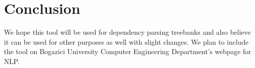 \section{Conclusion}
\label{sec:conclusion}

We hope this tool will be used for dependency parsing treebanks and also believe it can be used for other purposes as well with slight changes.
We plan to include the tool on Bogazici University Computer Engineering Department's webpage for NLP.
